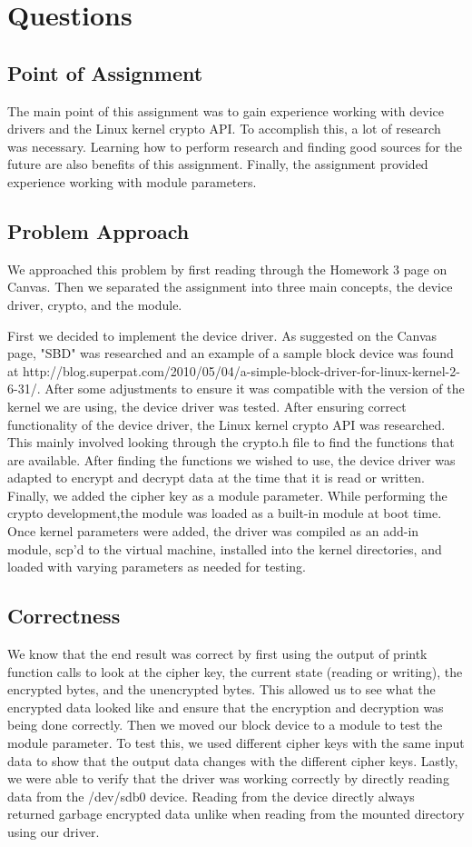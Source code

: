 \section{Questions}
\subsection{Point of Assignment}
The main point of this assignment was to gain experience working with device drivers and the Linux kernel crypto API. To accomplish this, a lot of research was necessary. Learning how to perform research and finding good sources for the future are also benefits of this assignment. Finally, the assignment provided experience working with module parameters.

\subsection{Problem Approach}
We approached this problem by first reading through the Homework 3 page on Canvas. Then we separated the assignment into three main concepts, the device driver, crypto, and the module. 

First we decided to implement the device driver. As suggested on the Canvas page, "SBD" was researched and an example of a sample block device was found at http://blog.superpat.com/2010/05/04/a-simple-block-driver-for-linux-kernel-2-6-31/. After some adjustments to ensure it was compatible with the version of the kernel we are using, the device driver was tested. After ensuring correct functionality of the device driver, the Linux kernel crypto API was researched. This mainly involved looking through the crypto.h file to find the functions that are available. After finding the functions we wished to use, the device driver was adapted to encrypt and decrypt data at the time that it is read or written. Finally, we added the cipher key as a module parameter. While performing the crypto development,the module was loaded as a built-in module at boot time. Once kernel parameters were added, the driver was compiled as an add-in module, scp'd to the virtual machine, installed into the kernel directories, and loaded with varying parameters as needed for testing.

\subsection{Correctness}
We know that the end result was correct by first using the output of printk function calls to look at the cipher key, the current state (reading or writing), the encrypted bytes, and the unencrypted bytes. This allowed us to see what the encrypted data looked like and ensure that the encryption and decryption was being done correctly. Then we moved our block device to a module to test the module parameter. To test this, we used different cipher keys with the same input data to show that the output data changes with the different cipher keys. Lastly, we were able to verify that the driver was working correctly by directly reading data from the /dev/sdb0 device. Reading from the device directly always returned garbage encrypted data unlike when reading from the mounted directory using our driver.

